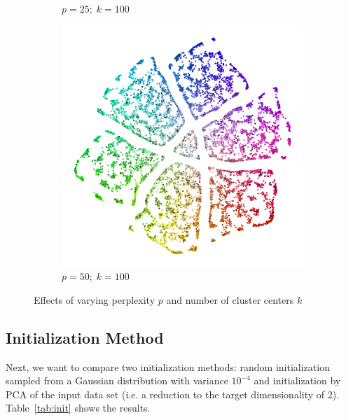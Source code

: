 \begin{figure}[!p]
\begin{subfigure}{0.3\linewidth}
    \caption{$p = 25;\; k = 100$}
\end{subfigure}
\begin{subfigure}{0.3\linewidth}
  \centering
    \includegraphics[width=\linewidth]{img/ktsne_color_n_10000_embedding_eta_200_p_50_l_100_crosspolytope_k_100_K_100_pca_x_12_X_1_s_666-1}
    \caption{$p = 50;\; k = 100$}
\end{subfigure}
\caption{Effects of varying perplexity $p$ and number of cluster centers $k$}
\label{fig:basic-mat}
\end{figure}

\subsection{Initialization Method}

Next, we want to compare two initialization methods: random initialization
sampled from a Gaussian distribution with variance $10^{-4}$ and initialization
by PCA of the input data set (i.e. a reduction to the target dimensionality of
2). Table~\ref{tab:init} shows the results.

